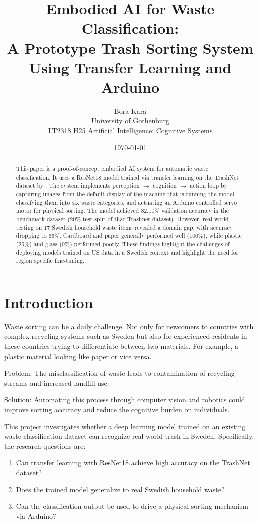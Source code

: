 \documentclass[11pt,a4paper]{article}
\title{Embodied AI for Waste Classification: \\A Prototype Trash Sorting System Using Transfer Learning and Arduino}
\author{Bora Kara \\
  University of Gothenburg \\
  LT2318 H25 Artificial Intelligence: Cognitive Systems \\
}
\date{\today}
\begin{document}
\maketitle

\begin{abstract}
This paper is a proof-of-concept embodied AI system for automatic waste classification. It uses a ResNet18 model trained via transfer learning on the TrashNet dataset by \citet{thung2016trashnet}. The system implements  perception $\rightarrow$ cognition $\rightarrow$ action loop by capturing images from the default display of the machine that is running the model, classifying them into six waste categories, and actuating an Arduino controlled servo motor for physical sorting. The model achieved 82.10\% validation accuracy in the benchmark dataset (20\% test split of that Trashnet dataset). However, real world testing on 17 Swedish household waste items revealed a domain gap, with accuracy dropping to 65\%. Cardboard and paper generally performed well (100\%), while plastic (25\%) and glass (0\%) performed poorly. These findings highlight the challenges of deploying models trained on US data in a Swedish context and highlight the need for region specific fine-tuning.
\end{abstract}

\section{Introduction}

Waste sorting can be a daily challenge. Not only for newcomers to countries with complex recycling systems such as Sweden but also for experienced residents in these countries trying to differentiate between two materials. For example, a plastic material looking like paper or vice versa.

Problem: The misclassification of waste leads to contamination of recycling streams and increased landfill use. 

Solution: Automating this process through computer vision and robotics could improve sorting accuracy and reduce the cognitive burden on individuals.

This project investigates whether a deep learning model trained on an existing waste classification dataset can recognize real world trash in Sweden. Specifically, the research questions are:

\begin{enumerate}
  \item Can transfer learning with ResNet18 achieve high accuracy on the TrashNet dataset?
  \item Does the trained model generalize to real Swedish household waste?
  \item Can the classification output be used to drive a physical sorting mechanism via Arduino?
\end{enumerate}
\end{document}
